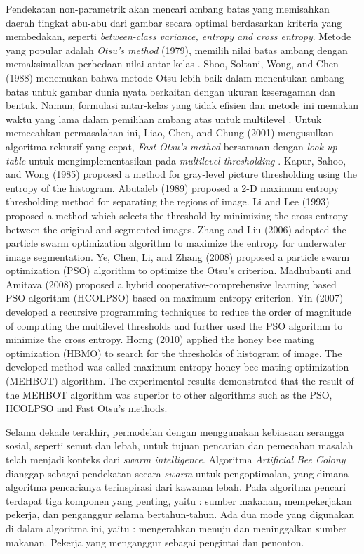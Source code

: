 \documentclass[a4paper, 10pt, conference]{ieeeconf}
\begin{document}
Pendekatan non-parametrik akan mencari ambang batas yang memisahkan daerah tingkat abu-abu dari gambar secara optimal berdasarkan kriteria yang membedakan, seperti \textit{between-class variance, entropy and cross entropy}. 
Metode yang popular adalah \textit{Otsu's method} (1979), memilih nilai batas ambang dengan memaksimalkan perbedaan nilai antar kelas \cite{c4}. 
Shoo, Soltani, Wong, and Chen (1988) menemukan bahwa metode Otsu lebih baik dalam menentukan ambang batas untuk gambar dunia nyata berkaitan dengan ukuran keseragaman dan bentuk. Namun, formulasi antar-kelas yang tidak efisien dan metode ini memakan waktu yang lama dalam pemilihan ambang atas untuk multilevel \cite{c5}. 
Untuk memecahkan permasalahan ini, Liao, Chen, and Chung (2001) mengusulkan algoritma rekursif yang cepat, \textit{Fast Otsu's method} bersamaan dengan \textit{look-up-table} untuk mengimplementasikan pada \textit{multilevel thresholding} \cite{c6}.
Kapur, Sahoo, and Wong (1985) proposed a method for gray-level picture thresholding using the entropy of the histogram. 
Abutaleb (1989) proposed a 2-D maximum entropy thresholding method for separating the regions of image. 
Li and Lee (1993) proposed a method which selects the threshold by minimizing the cross entropy between the original and segmented images.
Zhang and Liu (2006) adopted the particle swarm optimization algorithm to maximize the entropy for underwater image segmentation. 
Ye, Chen, Li, and Zhang (2008) proposed a particle swarm optimization (PSO) algorithm to optimize the Otsu’s criterion.
Madhubanti and Amitava (2008) proposed a hybrid cooperative-comprehensive learning based PSO algorithm (HCOLPSO) based on maximum entropy criterion.
Yin (2007) developed a recursive programming techniques to reduce the order of magnitude of computing the multilevel thresholds and further used the PSO algorithm to minimize the cross entropy. 
Horng (2010) applied the honey bee mating optimization (HBMO) to search for the thresholds of histogram of image. The developed method was called maximum entropy honey bee mating optimization (MEHBOT) algorithm. The experimental results demonstrated that the result of the MEHBOT algorithm was superior to other algorithms such as the PSO, HCOLPSO and Fast Otsu’s methods. \par

Selama dekade terakhir, permodelan dengan menggunakan kebiasaan serangga sosial, seperti semut dan lebah, untuk tujuan pencarian dan pemecahan masalah telah menjadi konteks dari \textit{swarm intelligence}. Algoritma \textit{Artificial Bee Colony} dianggap sebagai pendekatan secara \textit{swarm} untuk pengoptimalan, yang dimana algoritma pencarianya terinspirasi dari kawanan lebah. Pada algoritma pencari terdapat tiga komponen yang penting, yaitu : sumber makanan, mempekerjakan pekerja, dan penganggur selama bertahun-tahun. Ada dua mode yang digunakan di dalam algoritma ini, yaitu : mengerahkan menuju dan meninggalkan sumber makanan. Pekerja yang menganggur sebagai pengintai dan penonton. \par
\end{document}
